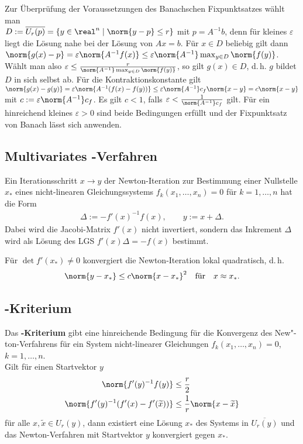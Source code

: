Zur Überprüfung der Voraussetzungen des Banachschen Fixpunktsatzes wählt man \\
$D := \overline{U_r(p)} = \{y \in \real^n \;|\; \norm{y - p} \le r\}$
mit $p = A^{-1} b$, denn für kleines $\varepsilon$ liegt die Lösung
nahe bei der Lösung von $Ax = b$.
Für $x \in D$ beliebig gilt dann
$\norm{g(x) - p} = \varepsilon \norm{A^{-1} f(x)} \le
\varepsilon \norm{A^{-1}} \max_{y \in D} \norm{f(y)}$.
Wählt man also
$\varepsilon \le \frac{r}{\norm{A^{-1}} \max_{y \in D} \norm{f(y)}}$,
so gilt $g(x) \in D$, d.\,h. $g$ bildet $D$ in sich selbst ab.
Für die Kontraktionskonstante gilt
$\norm{g(x) - g(y)} = \varepsilon \norm{A^{-1} (f(x) - f(y))} \le
\varepsilon \norm{A^{-1}} c_f \norm{x - y} = c \norm{x - y}$
mit $c := \varepsilon \norm{A^{-1}} c_f$.
Es gilt $c < 1$, falls $\varepsilon < \frac{1}{\norm{A^{-1}} c_f}$ gilt.
Für ein hinreichend kleines $\varepsilon > 0$ sind beide Bedingungen
erfüllt und der Fixpunktsatz von Banach lässt sich anwenden.

\subsection{%
    Multivariates -Verfahren%
}

Ein Iterationsschritt $x \rightarrow y$ der Newton-Iteration zur Bestimmung
einer Nullstelle $x_\ast$ eines nicht-linearen Gleichungssystems
$f_k(x_1, \dotsc, x_n) = 0$ für $k = 1, \dotsc, n$ hat die Form
\begin{align*}
    \Delta := -f'(x)^{-1} f(x), \qquad
    y := x + \Delta.
\end{align*}
Dabei wird die Jacobi-Matrix $f'(x)$ nicht invertiert, sondern das Inkrement
$\Delta$ wird als Lösung des LGS $f'(x) \Delta = -f(x)$ bestimmt.

Für $\det f'(x_\ast) \not= 0$ konvergiert die Newton-Iteration lokal
quadratisch, d.\,h.
\begin{align*}
    \norm{y - x_\ast} \le c \norm{x - x_\ast}^2 \quad\text{für}\quad
    x \approx x_\ast.
\end{align*}

\subsection{%
    -Kriterium%
}

Das \textbf{-Kriterium} gibt eine hinreichende Bedingung
für die Konvergenz des New"-ton-Verfahrens für ein System nicht-linearer
Gleichungen $f_k(x_1, \dotsc, x_n) = 0$, $k = 1, \dotsc, n$. \\
Gilt für einen Startvektor $y$
\begin{align*}
    \norm{f'(y)^{-1} f(y)} & \le \frac{r}{2} \\
    \norm{f'(y)^{-1} (f'(x) - f'(\widetilde{x}))} &
    \le \frac{1}{r} \norm{x - \widetilde{x}}
\end{align*}
für alle $x, \widetilde{x} \in U_r(y)$, dann existiert eine Lösung $x_\ast$
des Systems in $\overline{U_r(y)}$ und das Newton-Verfahren mit Startvektor $y$
konvergiert gegen $x_\ast$.

